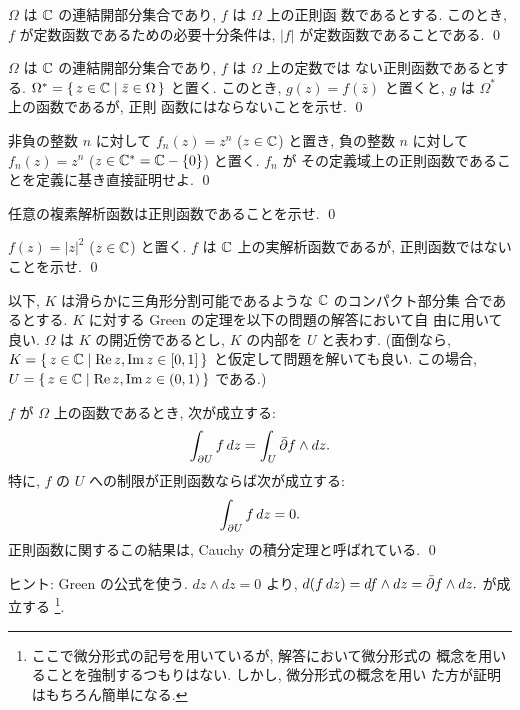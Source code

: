 \documentclass[12pt,twoside]{jarticle}
\begin{document}
\begin{question}
  $\Omega$ は ${\mathbb C}$ の連結開部分集合であり, $f$ は $\Omega$ 上の正則函
  数であるとする. このとき, $f$ が定数函数であるための必要十分条件は,
  $|f|$ が定数函数であることである. \qed
\end{question}

\begin{question}
  $\Omega$ は ${\mathbb C}$ の連結開部分集合であり, $f$ は $\Omega$ 上の定数では
  ない正則函数であるとする. %
  $\Omega^*=\{\,z\in{\mathbb C} \mid \bar z \in \Omega\,\}$ と置く. このとき,
  $g(z)=f(\bar z)$ と置くと, $g$ は $\Omega^*$ 上の函数であるが, 正則
  函数にはならないことを示せ. \qed
\end{question}

\begin{question}
  非負の整数 $n$ に対して $f_n(z)=z^n$ ($z\in{\mathbb C}$) と置き, 負の整数 $n$ 
  に対して $f_n(z)=z^n$ ($z \in {\mathbb C}^* = {\mathbb C} - \{ 0 \}$) と置く. $f_n$ が
  その定義域上の正則函数であることを定義に基き直接証明せよ. \qed
\end{question}

\begin{question}
  任意の複素解析函数は正則函数であることを示せ. \qed
\end{question}

\begin{question}
  $f(z)=|z|^2$ ($z\in{\mathbb C}$) と置く. $f$ は ${\mathbb C}$ 上の実解析函数であるが, 
  正則函数ではないことを示せ. \qed
\end{question}


以下, $K$ は滑らかに三角形分割可能であるような ${\mathbb C}$ のコンパクト部分集
合であるとする. $K$ に対する Green の定理を以下の問題の解答において自
由に用いて良い. %
$\Omega$ は $K$ の開近傍であるとし, $K$ の内部を $U$ と表わす. %
(面倒なら, %
$K=\{\,z\in{\mathbb C}\mid \mathop{\mathrm{Re}}\nolimits z, \mathop{\mathrm{Im}}\nolimits z \in [0,1] \,\}$ %
と仮定して問題を解いても良い. この場合, %
$U=\{\,z\in{\mathbb C}\mid \mathop{\mathrm{Re}}\nolimits z, \mathop{\mathrm{Im}}\nolimits z \in (0,1) \,\}$ %
である.)

\begin{question}
  $f$ が $\Omega$ 上の函数であるとき, 次が成立する:
  \[
    \int_{\partial U} f\,dz = \int_U  {\bar\partial} f \wedge dz.
  \]%
  特に, $f$ の $U$ への制限が正則函数ならば次が成立する:
  \[
    \int_{\partial U} f\,dz = 0.
  \]%
  正則函数に関するこの結果は, Cauchy の積分定理と呼ばれている.
  \qed
\end{question}

\noindent ヒント: Green の公式を使う. $dz\wedge dz = 0$ より, 
\(
  d(f\,dz) = df\wedge dz = {\bar\partial} f \wedge dz.
\) %
が成立する%
\footnote{ここで微分形式の記号を用いているが, 解答において微分形式の
  概念を用いることを強制するつもりはない. しかし, 微分形式の概念を用い
  た方が証明はもちろん簡単になる.}. 
%
\end{document}
